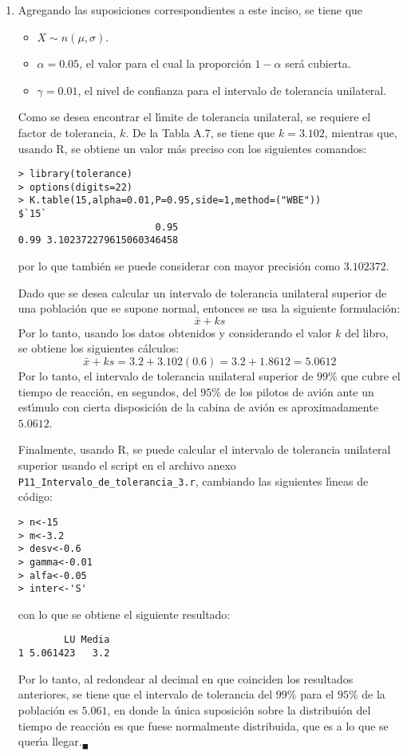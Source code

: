 \begin{solucion}
\begin{enumerate}
  \item Agregando las suposiciones correspondientes a este inciso, se tiene que
  \begin{itemize}
   \item $X \sim n(\mu, \sigma)$.
   \item $\alpha = 0.05$, el valor para el cual la proporci\'on $1-\alpha$ ser\'a cubierta.
   \item $\gamma = 0.01$, el nivel de confianza para el intervalo de tolerancia unilateral.
  \end{itemize}
  Como se desea encontrar el l\'{\i}mite de tolerancia unilateral, se requiere el factor de tolerancia, $k$. De la Tabla A.7, se tiene que $k = 3.102$, mientras que, usando R, se obtiene un valor m\'as preciso con los siguientes comandos:
  \begin{verbatim}
> library(tolerance)
> options(digits=22)
> K.table(15,alpha=0.01,P=0.95,side=1,method=("WBE"))
$`15`
                        0.95
0.99 3.102372279615060346458
  \end{verbatim}
  \vspace{-0.5cm}
  por lo que tambi\'en se puede considerar con mayor precisi\'on como $3.102372$.
  \par 
  Dado que se desea calcular un intervalo de tolerancia unilateral superior de una poblaci\'on que se supone normal, entonces se usa la siguiente formulaci\'on:
  \begin{equation*}
   \bar{x} + ks
  \end{equation*}
  Por lo tanto, usando los datos obtenidos y considerando el valor $k$ del libro, se obtiene los siguientes c\'alculos:
  \begin{equation*}
   \bar{x}+ks = 3.2 + 3.102(0.6) = 3.2 + 1.8612 = 5.0612
  \end{equation*}
  Por lo tanto, el intervalo de tolerancia unilateral superior de $99\%$ que cubre el tiempo de reacci\'on, en segundos, del $95\%$ de los pilotos de avi\'on ante un est\'{\i}mulo con cierta disposici\'on de la cabina de avi\'on es aproximadamente $5.0612$.
  \par 
  Finalmente, usando R, se puede calcular el intervalo de tolerancia unilateral superior usando el script en el archivo anexo \texttt{P11\_Intervalo\_de\_tolerancia\_3.r}, cambiando las siguientes l\'{\i}neas de c\'odigo:
  \begin{verbatim}
> n<-15
> m<-3.2
> desv<-0.6
> gamma<-0.01
> alfa<-0.05
> inter<-'S'
  \end{verbatim}
  \vspace{-0.5cm}
  con lo que se obtiene el siguiente resultado:
  \begin{verbatim}
        LU Media
1 5.061423   3.2
  \end{verbatim}
  \vspace{-0.5cm}
  Por lo tanto, al redondear al decimal en que coinciden los resultados anteriores, se tiene que el intervalo de tolerancia del $99\%$ para el $95\%$ de la poblaci\'on es $5.061$, en donde la \'unica suposici\'on sobre la distribui\'on del tiempo de reacci\'on es que fuese normalmente distribuida, que es a lo que se quer\'{\i}a llegar.${}_{\blacksquare}$
 \end{enumerate}
\end{solucion}
